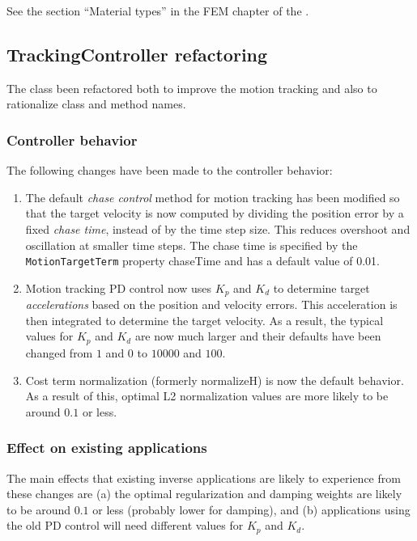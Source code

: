 \documentclass{article}
\begin{document}
See the section ``Material types'' in the FEM chapter of the 
.

\subsection{TrackingController refactoring}

The  class been
refactored both to improve the motion tracking and also to rationalize class
and method names.

\subsubsection{Controller behavior}

The following changes have been made to the controller behavior:

\begin{enumerate}

\item The default {\it chase control} method for motion tracking has been
modified so that the target velocity is now computed by dividing the position
error by a fixed {\it chase time}, instead of by the time step size. This
reduces overshoot and oscillation at smaller time steps. The chase time is
specified by the {\tt MotionTargetTerm} property {\sf chaseTime} and has a
default value of 0.01.

\item Motion tracking PD control now uses $K_p$ and $K_d$ to determine target
{\it accelerations} based on the position and velocity errors. This
acceleration is then integrated to determine the target velocity.  As a result,
the typical values for $K_p$ and $K_d$ are now much larger and their defaults
have been changed from $1$ and $0$ to $10000$ and $100$.

\item Cost term normalization (formerly {\sf normalizeH}) is now the default
behavior. As a result of this, optimal L2 normalization values are more likely
to be around $0.1$ or less.

\end{enumerate}

\subsubsection{Effect on existing applications}

The main effects that existing inverse applications are likely to experience
from these changes are (a) the optimal regularization and damping weights are
likely to be around $0.1$ or less (probably lower for damping), and (b)
applications using the old PD control will need different values for $K_p$ and
$K_d$.
\end{document}
